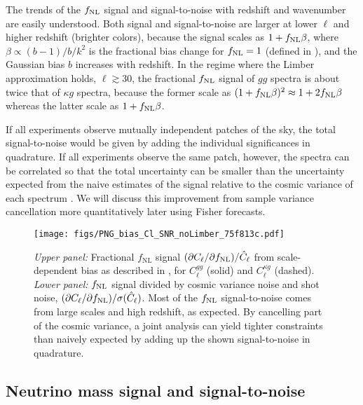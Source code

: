\documentclass[prd,superscriptaddress,floatfix,notitlepage,nofootinbib,reprint]{revtex4-1} %
\begin{document}
The trends of the ${f_\mathrm{NL}}$ signal and signal-to-noise with redshift and wavenumber are easily understood. 
Both signal and signal-to-noise are larger at lower $\ell$ and higher redshift (brighter colors), because the signal scales as $1+{f_\mathrm{NL}}\beta$, where $\beta\propto(b-1)/b/k^2$ is the fractional bias change for ${f_\mathrm{NL}}=1$ (defined in ), and the Gaussian bias $b$ increases with redshift.
In the regime where the Limber approximation holds, $\ell\gtrsim 30$, the fractional ${f_\mathrm{NL}}$ signal of $gg$ spectra is about twice that of $\kappa g$ spectra,
because the former scale as 
$(1+{f_\mathrm{NL}}\beta)^2\approx 1+2{f_\mathrm{NL}}\beta$
whereas the latter scale as $1+{f_\mathrm{NL}}\beta$.

If all experiments observe mutually independent patches of the sky, the total signal-to-noise would be given by adding the individual significances in quadrature.
If all experiments observe the same patch, however, the spectra can be correlated so that the total uncertainty can be smaller than the  uncertainty expected from the naive estimates of the signal relative to the cosmic variance of each spectrum \cite{Uros0807}.
We will discuss this improvement from sample variance cancellation more quantitatively later using Fisher forecasts.


\begin{figure}[tbp]
\texttt{[image: figs/PNG\_bias\_Cl\_SNR\_noLimber\_75f813c.pdf]}
\caption{\emph{Upper panel:} Fractional $f_\mathrm{NL}$ signal $(\partial C_\ell/\partial {f_\mathrm{NL}})/\hat C_\ell$ from scale-dependent bias as described in , for $C^{gg}_\ell$ (solid) and $C^{\kappa g}_\ell$ (dashed).
\emph{Lower panel:} ${f_\mathrm{NL}}$ signal divided by cosmic variance noise and shot noise, $(\partial C_\ell/\partial {f_\mathrm{NL}})/\sigma(\hat C_\ell)$.
Most of the ${f_\mathrm{NL}}$ signal-to-noise comes from large scales and high redshift, as expected.
By cancelling part of the cosmic variance, a joint analysis can yield tighter constraints than naively expected by adding up the shown signal-to-noise in quadrature.
}
\label{fig:fnlSignalNoise}
\end{figure}





\subsection{Neutrino mass signal and signal-to-noise}
\end{document}
